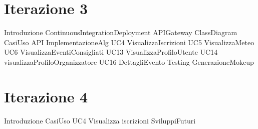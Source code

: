 \documentclass[a4paper, 12pt]{book}
\begin{document}
\chapter{Iterazione 3}
{Introduzione}
\clearpage
{ContinuousIntegrationDeployment}
\clearpage
{APIGateway}
\clearpage
{ClassDiagram}
\clearpage
{CasiUso}
\clearpage
{API}
\clearpage
{ImplementazioneAlg}
\clearpage
{UC4 VisualizzaIscrizioni}
\clearpage
{UC5 VisualizzaMeteo}
\clearpage
{UC6 VisualizzaEventiConsigliati}
\clearpage
{UC13 VisualizzaProfiloUtente}
\clearpage
{UC14 visualizzaProfiloOrganizzatore}
\clearpage
{UC16 DettagliEvento}
\clearpage
{Testing}
\clearpage
{GenerazioneMokcup}
\clearpage 


\chapter{Iterazione 4}
{Introduzione}
\clearpage
{CasiUso}
\clearpage
{UC4 Visualizza iscrizioni}
\clearpage
{SviluppiFuturi}
\clearpage
\end{document}
